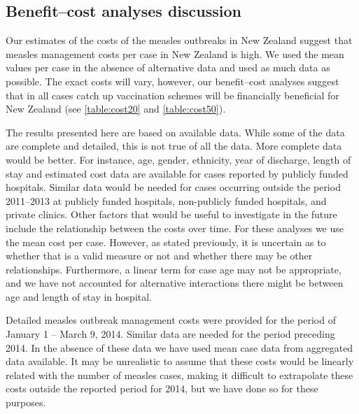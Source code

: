 \documentclass{article}
\begin{document}
\subsection{Benefit--cost analyses discussion}

Our estimates of the costs of the measles outbreaks in New Zealand suggest that measles management costs per case in New Zealand is high. We used the mean values per case in the absence of alternative data and used as much data as possible. The exact costs will vary, however, our benefit--cost analyses suggest that in all cases catch up vaccination schemes will be financially beneficial for New Zealand (see \autoref{table:cost20} and \autoref{table:cost50}).

The results presented here are based on available data. While some of the data are complete and detailed, this is not true of all the data. More complete data would be better. For instance, age, gender, ethnicity, year of discharge, length of stay and estimated cost data are available for cases reported by publicly funded hospitals. Similar data would be needed for cases occurring outside the period 2011--2013 at publicly funded hospitals, non-publicly funded hospitals, and private clinics. Other factors that would be useful to investigate in the future include the relationship between the costs over time. For these analyses we use the mean cost per case. However, as stated previously, it is uncertain as to whether that is a valid measure or not and whether there may be other relationships. Furthermore, a linear term for case age may not be appropriate, and we have not accounted for alternative interactions there might be between age and length of stay in hospital.

Detailed measles outbreak management costs were provided for the period of January 1 -- March 9, 2014. Similar data are needed for the period preceding 2014. In the absence of these data we have used mean case data from aggregated data available. It may be unrealistic to assume that these costs would be linearly related with the number of measles cases, making it difficult to extrapolate these costs outside the reported period for 2014, but we have done so for these purposes.
\end{document}
